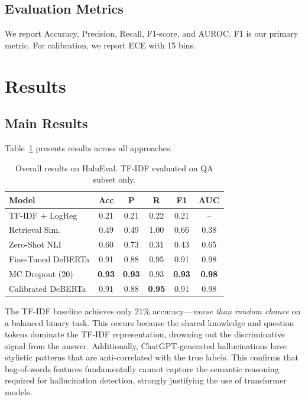 \documentclass[11pt]{article}
\begin{document}
\subsection{Evaluation Metrics}

We report Accuracy, Precision, Recall, F1-score, and AUROC. F1 is our primary metric. For calibration, we report ECE with 15 bins.

\section{Results}

\subsection{Main Results}

Table~\ref{tab:main_results} presents results across all approaches.

\begin{table}[h]
\centering
\small
\begin{tabular}{lccccc}
\toprule
\textbf{Model} & \textbf{Acc} & \textbf{P} & \textbf{R} & \textbf{F1} & \textbf{AUC} \\
\midrule
TF-IDF + LogReg & 0.21 & 0.21 & 0.22 & 0.21 & -- \\
Retrieval Sim. & 0.49 & 0.49 & 1.00 & 0.66 & 0.38 \\
Zero-Shot NLI & 0.60 & 0.73 & 0.31 & 0.43 & 0.65 \\
Fine-Tuned DeBERTa & 0.91 & 0.88 & 0.95 & 0.91 & 0.98 \\
MC Dropout (20) & \textbf{0.93} & \textbf{0.93} & 0.93 & \textbf{0.93} & \textbf{0.98} \\
Calibrated DeBERTa & 0.91 & 0.88 & \textbf{0.95} & 0.91 & 0.98 \\
\bottomrule
\end{tabular}
\caption{Overall results on HaluEval. TF-IDF evaluated on QA subset only.}
\label{tab:main_results}
\end{table}

The TF-IDF baseline achieves only 21\% accuracy---\textit{worse than random chance} on a balanced binary task. This occurs because the shared knowledge and question tokens dominate the TF-IDF representation, drowning out the discriminative signal from the answer. Additionally, ChatGPT-generated hallucinations have stylistic patterns that are anti-correlated with the true labels. This confirms that bag-of-words features fundamentally cannot capture the semantic reasoning required for hallucination detection, strongly justifying the use of transformer models.
\end{document}
